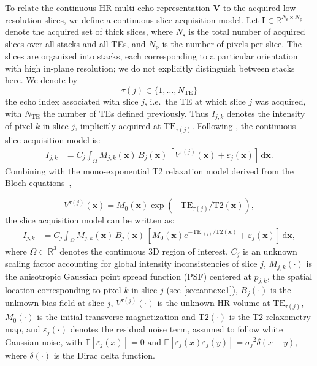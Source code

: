 \documentclass[preprint,authoryear,12pt]{elsarticle}
\begin{document}
To relate the continuous HR multi-echo representation
$\mathbf{V}$ to the acquired low-resolution slices, we define a continuous slice acquisition model. Let
$\mathbf{I} \in \mathbb{R}^{N_{\mathrm{s}} \times N_{\mathrm{p}}}$ denote the acquired set of thick slices, where
$N_{\mathrm{s}}$ is the total number of acquired slices over all stacks and all TEs, and
$N_{\mathrm{p}}$ is the number of pixels per slice.
The slices are organized into stacks, each corresponding to a particular orientation with high in-plane resolution; we do not explicitly distinguish between stacks here. We denote by
\[
\tau(j) \in \{1,\dots,N_{\mathrm{TE}}\}
\]
the echo index associated with slice $j$, i.e.\ the TE at which slice $j$ was acquired, with $N_{\mathrm{TE}}$ the number of TEs defined previously. Thus $I_{j,k}$ denotes the intensity of pixel $k$ in slice $j$, implicitly acquired at $\mathrm{TE}_{\tau(j)}$. Following \citet{xu_nesvor_2023}, the continuous slice acquisition model is:
\begin{align}
I_{j,k}
&=
C_j
\int_{\Omega}
M_{j,k}(\mathbf{x}) \,
B_j(\mathbf{x}) \,
\left[
V^{\tau(j)}(\mathbf{x}) + \varepsilon_j(\mathbf{x})
\right]
\, \mathrm{d}\mathbf{x} .
\label{eq:continuous_forward}
\end{align}
Combining with the mono-exponential T2 relaxation model derived from the Bloch equations~\citep{brown_magnetic_2014},

\[
V^{\tau(j)}(\mathbf{x})
=
M_0(\mathbf{x})
\exp\!\left(
-\mathrm{TE}_{\tau(j)} / \mathrm{T2}(\mathbf{x})
\right),
\]
the slice acquisition model can be written as:
\begin{align}
I_{j,k}
&=
C_j
\int_{\Omega}
M_{j,k}(\mathbf{x}) \,
B_j(\mathbf{x}) \,
\left[
M_0(\mathbf{x}) e^{-\mathrm{TE}_{\tau(j)}/\mathrm{T2}(\mathbf{x})}
+ \varepsilon_j(\mathbf{x})
\right]
\, \mathrm{d}\mathbf{x},
\label{eq:continuous_forward_echo}
\end{align}
where $\Omega \subset \mathbb{R}^3$ denotes the continuous 3D region of interest, $C_j$ is an unknown scaling factor accounting for global intensity inconsistencies of slice $j$, $M_{j,k}(\cdot)$ is the anisotropic Gaussian point spread function (PSF) centered at $p_{j,k}$, the spatial location corresponding to pixel $k$ in slice $j$ (see \ref{sec:annexe1}), $B_j(\cdot)$ is the unknown bias field at slice $j$, $V^{\tau(j)}(\cdot)$ is the unknown HR volume at $\mathrm{TE}_{\tau(j)}$, $M_0(\cdot)$ is the initial transverse magnetization and $\mathrm{T2}(\cdot)$ is the T2 relaxometry map, and $\varepsilon_j(\cdot)$ denotes the residual noise term, assumed to follow white Gaussian noise, with $\mathbb{E}[\varepsilon_j(x)] = 0\text{ and }\mathbb{E}[\varepsilon_j(x)\varepsilon_j(y)]={\sigma_j}^2\delta(x - y),$ where $\delta(\cdot)$ is the Dirac delta function.
\end{document}
